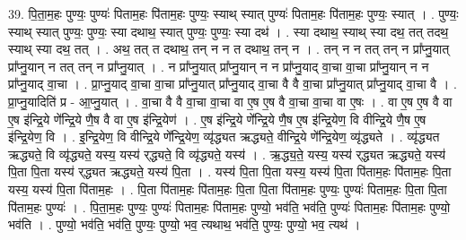 \documentclass[17pt]{extarticle}
\begin{document}
39. पि॒ता॒म॒हः पुण्यः॒ पुण्यः॑ पिताम॒हः पि॑ताम॒हः पुण्यः॒ स्याथ् स्यात् पुण्यः॑ पिताम॒हः पि॑ताम॒हः पुण्यः॒ स्यात् । . पुण्यः॒ स्याथ् स्यात् पुण्यः॒ पुण्यः॒ स्या दथाथ॒ स्यात् पुण्यः॒ पुण्यः॒ स्या दथ॑ । . स्या दथाथ॒ स्याथ् स्या दथ॒ तत् तदथ॒ स्याथ् स्या दथ॒ तत् । . अथ॒ तत् त दथाथ॒ तन् न न त दथाथ॒ तन् न । . तन् न न तत् तन् न प्रा᳚प्नु॒यात् प्रा᳚प्नु॒यान् न तत् तन् न प्रा᳚प्नु॒यात् । . न प्रा᳚प्नु॒यात् प्रा᳚प्नु॒यान् न न प्रा᳚प्नु॒याद् वा॒चा वा॒चा प्रा᳚प्नु॒यान् न न प्रा᳚प्नु॒याद् वा॒चा । . प्रा॒प्नु॒याद् वा॒चा वा॒चा प्रा᳚प्नु॒यात् प्रा᳚प्नु॒याद् वा॒चा वै वै वा॒चा प्रा᳚प्नु॒यात् प्रा᳚प्नु॒याद् वा॒चा वै । . प्रा॒प्नु॒यादिति॑ प्र - आ॒प्नु॒यात् । . वा॒चा वै वै वा॒चा वा॒चा वा ए॒ष ए॒ष वै वा॒चा वा॒चा वा ए॒षः । . वा ए॒ष ए॒ष वै वा ए॒ष इ॑न्द्रि॒ये णे᳚न्द्रि॒ये णै॒ष वै वा ए॒ष इ॑न्द्रि॒येण॑ । . ए॒ष इ॑न्द्रि॒ये णे᳚न्द्रि॒ये णै॒ष ए॒ष इ॑न्द्रि॒येण॒ वि वीन्द्रि॒ये णै॒ष ए॒ष इ॑न्द्रि॒येण॒ वि । . इ॒न्द्रि॒येण॒ वि वीन्द्रि॒ये णे᳚न्द्रि॒येण॒ व्यृ॑द्ध्यत ऋद्ध्यते॒ वीन्द्रि॒ये णे᳚न्द्रि॒येण॒ व्यृ॑द्ध्यते । . व्यृ॑द्ध्यत ऋद्ध्यते॒ वि व्यृ॑द्ध्यते॒ यस्य॒ यस्य॑ र्‌द्ध्यते॒ वि व्यृ॑द्ध्यते॒ यस्य॑ । . ऋ॒द्ध्य॒ते॒ यस्य॒ यस्य॑ र्‌द्ध्यत ऋद्ध्यते॒ यस्य॑ पि॒ता पि॒ता यस्य॑ र्‌द्ध्यत ऋद्ध्यते॒ यस्य॑ पि॒ता । . यस्य॑ पि॒ता पि॒ता यस्य॒ यस्य॑ पि॒ता पि॑ताम॒हः पि॑ताम॒हः पि॒ता यस्य॒ यस्य॑ पि॒ता पि॑ताम॒हः । . पि॒ता पि॑ताम॒हः पि॑ताम॒हः पि॒ता पि॒ता पि॑ताम॒हः पुण्यः॒ पुण्यः॑ पिताम॒हः पि॒ता पि॒ता पि॑ताम॒हः पुण्यः॑ । . पि॒ता॒म॒हः पुण्यः॒ पुण्यः॑ पिताम॒हः पि॑ताम॒हः पुण्यो॒ भव॑ति॒ भव॑ति॒ पुण्यः॑ पिताम॒हः पि॑ताम॒हः पुण्यो॒ भव॑ति । . पुण्यो॒ भव॑ति॒ भव॑ति॒ पुण्यः॒ पुण्यो॒ भव॒ त्यथाथ॒ भव॑ति॒ पुण्यः॒ पुण्यो॒ भव॒ त्यथ॑ । \newline
\pagebreak
{}
\end{document}
